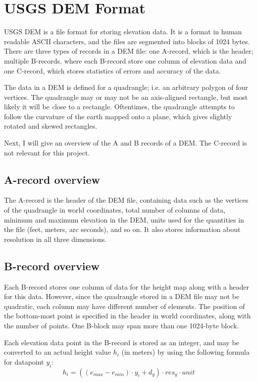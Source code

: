 \section{USGS DEM Format}
USGS DEM is a file format for storing elevation data. It is a format in human readable ASCII characters, and the files are segmented into blocks of 1024 bytes. There are three types of records in a DEM file: one A-record, which is the header; multiple B-records, where each B-record store one column of elevation data and one C-record, which stores statistics of errors and accuracy of the data.\cite{usgsdem}

The data in a DEM is defined for a quadrangle; i.e. an arbitrary polygon of four vertices. The quadrangle may or may not be an axis-aligned rectangle, but most likely it will be {\textit close} to a rectangle. Oftentimes, the quadrangle attempts to follow the curvature of the earth mapped onto a plane, which gives slightly rotated and skewed rectangles.

Next, I will give an overview of the A and B records of a DEM. The C-record is not relevant for this project.

\subsection{A-record overview}
The A-record is the header of the DEM file, containing data such as the vertices of the quadrangle in world coordinates, total number of columns of data, minimum and maximum elevation in the DEM, units used for the quantities in the file (feet, meters, arc seconds), and so on. It also stores information about resolution in all three dimensions. 

\subsection{B-record overview}
\label{sec:back_brecord}
Each B-record stores one column of data for the height map along with a header for this data. However, since the quadrangle stored in a DEM file may not be quadratic, each column may have different number of elements. The position of the bottom-most point is specified in the header in world coordinates, along with the number of points. One B-block may span more than one 1024-byte block.

Each elevation data point in the B-record is stored as an integer, and may be converted to an actual height value $h_i$ (in meters) by using the following formula for datapoint $y_i$:
$$
h_i = ((e_{max}-e_{min})\cdot y_i+ d_y)\cdot res_y \cdot unit
$$

